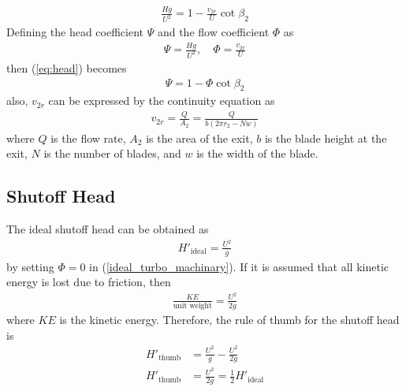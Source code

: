 \begin{align}
    \frac{Hg}{U^2} = 1 - \frac{v_{2r}}{U} \cot{\beta_2} \label{eq:head}
\end{align}
Defining the head coefficient $\Psi$ and the flow coefficient $\Phi$ as
\begin{align}
    \Psi = \frac{Hg}{U^2}, \quad \Phi = \frac{v_{2r}}{U} \label{eq:coefficients}
\end{align}
then (\ref{eq:head}) becomes
\begin{align}
    \Psi = 1 - \Phi \cot{\beta_2} \label{ideal_turbo_machinary}
\end{align}
also, $v_{2r}$ can be expressed by the continuity equation as 
\begin{align}
    v_{2r} = \frac{Q}{A_2} = \frac{Q}{b(2\pi r_2 - N w)} \label{eq:v2r}
\end{align}
where $Q$ is the flow rate, $A_2$ is the area of the exit, $b$ is the blade height at the exit, $N$ is the number of blades, and $w$ is the width of the blade. 

\subsection{Shutoff Head}
The ideal shutoff head can be obtained as 
\begin{align}
    H'_{\text{ideal}} = \frac{U^2}{g} \label{eq:ideal_shutoff_head}
\end{align}
by setting $\Phi = 0$ in (\ref{ideal_turbo_machinary}). If it is assumed that all kinetic energy is lost due to friction, then 
\begin{align*}
    \frac{KE}{\text{unit weight}} = \frac{U^2}{2g}
\end{align*}
where $KE$ is the kinetic energy. Therefore, the rule of thumb for the shutoff head is
\begin{align}
    H'_{\text{thumb}} &= \frac{U^2}{g} - \frac{U^2}{2g} \nonumber \\
    H'_{\text{thumb}} &= \frac{U^2}{2g} = \frac{1}{2} H'_{\text{ideal}} \label{eq:thumb_head}
\end{align}


